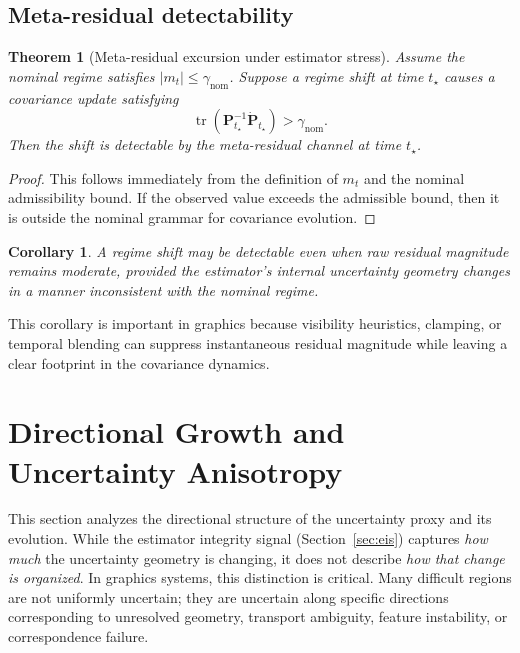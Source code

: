 \documentclass[11pt]{article}
\newcommand{\covar}{\mathbf{P}}
\newcommand{\metares}{m}
\newcommand{\trace}{\operatorname{tr}}
\newcommand{\abs}[1]{\left\lvert #1 \right\rvert}
\theoremstyle{definition}
\theoremstyle{plain}
\newtheorem{theorem}[definition]{Theorem}
\newtheorem{corollary}[definition]{Corollary}
\begin{document}
\subsection{Meta-residual detectability}
\begin{theorem}[Meta-residual excursion under estimator stress]
Assume the nominal regime satisfies $\abs{\metares_t} \le \gamma_{\mathrm{nom}}$. Suppose a regime shift at time $t_\star$ causes a covariance update satisfying
\begin{equation}
    \trace(\covar_{t_\star}^{-1}\dot{\covar}_{t_\star}) > \gamma_{\mathrm{nom}}.
\end{equation}
Then the shift is detectable by the meta-residual channel at time $t_\star$.
\end{theorem}

\begin{proof}
This follows immediately from the definition of $\metares_t$ and the nominal admissibility bound. If the observed value exceeds the admissible bound, then it is outside the nominal grammar for covariance evolution.
\end{proof}

\begin{corollary}
A regime shift may be detectable even when raw residual magnitude remains moderate, provided the estimator's internal uncertainty geometry changes in a manner inconsistent with the nominal regime.
\end{corollary}

This corollary is important in graphics because visibility heuristics, clamping, or temporal blending can suppress instantaneous residual magnitude while leaving a clear footprint in the covariance dynamics.


\section{Directional Growth and Uncertainty Anisotropy}
\label{sec:directional}

This section analyzes the directional structure of the uncertainty proxy and its evolution. While the estimator integrity signal (Section~\ref{sec:eis}) captures \emph{how much} the uncertainty geometry is changing, it does not describe \emph{how that change is organized}. In graphics systems, this distinction is critical. Many difficult regions are not uniformly uncertain; they are uncertain along specific directions corresponding to unresolved geometry, transport ambiguity, feature instability, or correspondence failure.
\end{document}
